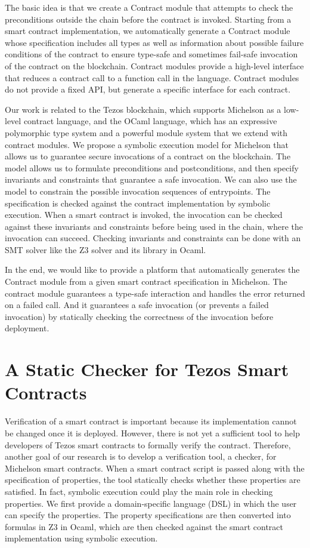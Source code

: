 \documentclass[a4paper,11pt]{article}
\begin{document}
The basic idea is that we create a Contract module that attempts to check the preconditions outside the chain before the contract is invoked. Starting from a smart contract implementation, we automatically generate a Contract module whose specification includes all types as well as information about possible failure conditions of the contract to ensure type-safe and sometimes fail-safe invocation of the contract on the blockchain. Contract modules provide a high-level interface that reduces a contract call to a function call in the language. Contract modules do not provide a fixed API, but generate a specific interface for each contract.

Our work is related to the Tezos blockchain, which supports Michelson as a low-level contract language, and the OCaml language, which has an expressive polymorphic type system and a powerful module system that we extend with contract modules. We propose a symbolic execution model for Michelson that allows us to guarantee secure invocations of a contract on the blockchain. The model allows us to formulate preconditions and postconditions, and then specify invariants and constraints that guarantee a safe invocation. We can also use the model to constrain the possible invocation sequences of entrypoints. The specification is checked against the contract implementation by symbolic execution. When a smart contract is invoked, the invocation can be checked against these invariants and constraints before being used in the chain, where the invocation can succeed. Checking invariants and constraints can be done with an SMT solver like the Z3 solver and its library in Ocaml. 

In the end, we would like to provide a platform that automatically generates the Contract module from a given smart contract specification in Michelson. The contract module guarantees a type-safe interaction and handles the error returned on a failed call. And it guarantees a safe invocation (or prevents a failed invocation) by statically checking the correctness of the invocation before deployment.
\section{A Static Checker for Tezos Smart Contracts}
\label{sec:static-checker}
Verification of a smart contract is important because its implementation cannot be changed once it is deployed. However, there is not yet a sufficient tool to help developers of Tezos smart contracts to formally verify the contract. Therefore, another goal of our research is to develop a verification tool, a checker, for Michelson smart contracts. When a smart contract script is passed along with the specification of properties, the tool statically checks whether these properties are satisfied. In fact, symbolic execution could play the main role in checking properties. We first provide a domain-specific language (DSL) in which the user can specify the properties. The property specifications are then converted into formulas in Z3 in Ocaml, which are then checked against the smart contract implementation using symbolic execution.
\end{document}
